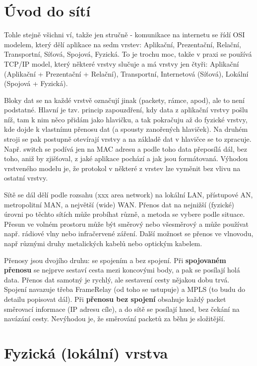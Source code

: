 \section{Úvod do sítí}

Tohle stejně všichni ví, takže jen stručně - komunikace na internetu se řídí OSI modelem, který dělí aplikace na sedm vrstev: Aplikační, Prezentační, Relační, Transportní, Síťová, Spojová, Fyzická. To je trochu moc, takže v praxi se používá TCP/IP model, který některé vrstvy slučuje a má vrstvy jen čtyři: Aplikační (Aplikační + Prezentační + Relační), Transportní, Internetová (Síťová), Lokální (Spojová + Fyzická).

Bloky dat se na každé vrstvě označují jinak (packety, rámce, apod), ale to není podstatné. Hlavní je tzv. princip zapouzdření, kdy data z aplikační vrstvy pošlu níž, tam k nim něco přidám jako hlavičku, a tak pokračuju až do fyzické vrstvy, kde dojde k vlastnímu přenosu dat (a spousty zanořených hlaviček). Na druhém stroji se pak postupně otevírají vrstvy a na základě dat v hlavičce se to zpracuje. Např. switch se podívá jen na MAC adresu a podle toho data přeposílá dál, bez toho, aniž by zjišťoval, z jaké aplikace pochází a jak jsou formátovaná. Výhodou vrstveného modelu je, že protokol v některé z vrstev lze vyměnit bez vlivu na ostatní vrstvy.

Sítě se dál dělí podle rozsahu (xxx area network) na lokální LAN, přístupové AN, metropolitní MAN, a největší (wide) WAN. Přenos dat na nejnižší (fyzické) úrovni po těchto sítích může probíhat různě, a metoda se vybere podle situace. Přesun ve volném prostoru může být směrový nebo všesměrový a může používat např. rádiové vlny nebo infračervené záření. Další možnost se přenos ve vlnovodu, např různými druhy metalických kabelů nebo optickým kabelem.

Přenosy jsou dvojího druhu: se spojením a bez spojení. Při \textbf{spojovaném přenosu} se nejprve sestaví cesta mezi koncovými body, a pak se posílají holá data. Přenos dat samotný je rychlý, ale sestavení cesty nějakou dobu trvá. Spojení navazuje třeba FrameRelay (od toho se ustupuje) a MPLS   (to budu do detailu popisovat dál). Při \textbf{přenosu bez spojení} obsahuje každý packet směrovací informace (IP adresu cíle), a do sítě se posílají hned, bez čekání na navázání cesty. Nevýhodou je, že směrování packetů za běhu je složitější.

\section{Fyzická (lokální) vrstva}

